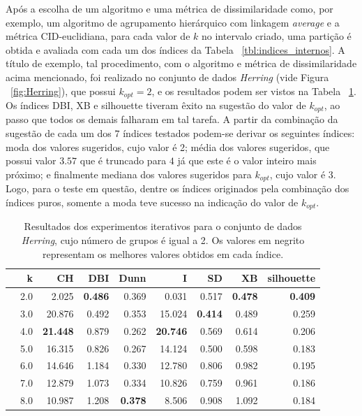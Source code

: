 Após a escolha de um algoritmo e uma métrica de dissimilaridade como, por exemplo, um algoritmo de agrupamento hierárquico com linkagem \emph{average} e a métrica CID-euclidiana, para cada valor de $k$ no intervalo criado, uma partição é obtida e avaliada com cada um dos índices da Tabela ~\ref{tbl:indices_internos}. A título de exemplo, tal procedimento, com o algoritmo e métrica de dissimilaridade acima mencionado, foi realizado no conjunto de dados \emph{Herring} (vide Figura ~\ref{fig:Herring}), que possui $k_{opt}=2$, e os resultados podem ser vistos na Tabela ~\ref{tbl:indices_iterativos}. Os índices DBI, XB e silhouette tiveram êxito na sugestão do valor de $k_{opt}$, ao passo que todos os demais falharam em tal tarefa. A partir da combinação da sugestão de cada um dos $7$ índices testados podem-se derivar os seguintes índices: moda dos valores sugeridos, cujo valor é 2; média dos valores sugeridos, que possui valor $3.57$ que é truncado para $4$ já que este é o valor inteiro mais próximo; e finalmente mediana dos valores sugeridos para $k_{opt}$, cujo valor é 3. Logo, para o teste em questão, dentre os índices originados pela combinação dos índices puros, somente a moda teve sucesso na indicação do valor de $k_{opt}$.

\begin{table} [!h]
	\centering
	\caption{Resultados dos experimentos iterativos para o conjunto de dados \emph{Herring}, cujo número de grupos é igual a 2. Os valores em negrito representam os melhores valores obtidos em cada índice.}  \label{tbl:indices_iterativos}
		\begin{tabular}{lrrrrrrrr}
			\toprule
			{} &    k &      CH &    DBI &   Dunn &       I &     SD &     XB &  silhouette \\
			\midrule
   \rowcolor{lightgray} &  2.0 &   2.025 &  \bfseries{0.486} &  0.369 &   0.031 &  0.517 &  \bfseries{0.478} &       \bfseries{0.409} \\
   &  3.0 &  20.876 &  0.492 &  0.353 &  15.024 &  \bfseries{0.414} &  0.489 &       0.259 \\
   &  4.0 &  \bfseries{21.448} &  0.879 &  0.262 &  \bfseries{20.746} &  0.569 &  0.614 &       0.206 \\
   &  5.0 &  16.315 &  0.826 &  0.267 &  14.124 &  0.500 &  0.598 &       0.183 \\
   &  6.0 &  14.646 &  1.184 &  0.330 &  12.780 &  0.806 &  0.982 &       0.195 \\
   &  7.0 &  12.879 &  1.073 &  0.334 &  10.826 &  0.759 &  0.961 &       0.186 \\
   &  8.0 &  10.987 &  1.208 &  \bfseries{0.378} &   8.506 &  0.908 &  1.092 &       0.184 \\
			\bottomrule
		\end{tabular}
\end{table} 

